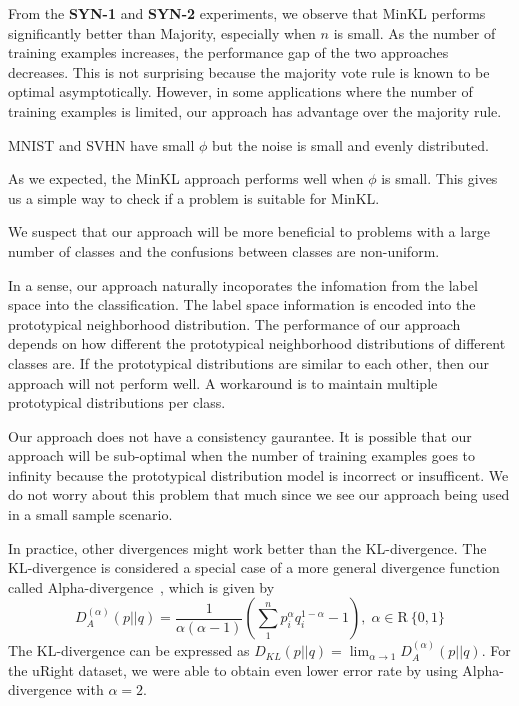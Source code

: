 \documentclass{article}
\begin{document}
From the \textbf{SYN-1} and \textbf{SYN-2} experiments, we observe
that MinKL performs significantly better than Majority, especially
when $n$ is small. As the number of training examples increases, the
performance gap of the two approaches decreases. This is not
surprising because the majority vote rule is known to be optimal
asymptotically. However, in some applications where the number of
training examples is limited, our approach has advantage over the
majority rule.

MNIST and SVHN have small $\phi$ but the noise is small and evenly distributed.


As we expected, the MinKL approach performs well when $\phi$ is
small. This gives us a simple way to check if a problem is suitable
for MinKL. 


We suspect that our approach will be more beneficial to problems with
a large number of classes and the confusions between classes are
non-uniform.


In a sense, our approach naturally incoporates the infomation from the
label space into the classification. The label space information is
encoded into the prototypical neighborhood distribution. The
performance of our approach depends on how different the prototypical
neighborhood distributions of different classes are. If the
prototypical distributions are similar to each other, then our
approach will not perform well. A workaround is to maintain multiple
prototypical distributions per class.

Our approach does not have a consistency gaurantee. It is
possible that our approach will be sub-optimal when the number of
training examples goes to infinity because the prototypical
distribution model is incorrect or insufficent. We do not worry
about this problem that much since we see our approach being used
in a small sample scenario.

In practice, other divergences might work better than the
KL-divergence. The KL-divergence is considered a special case of a
more general divergence function called
Alpha-divergence~\cite{Cichocki2010}, which is given by
\[
D^{(\alpha)}_A (p||q) = \frac{1}{\alpha(\alpha - 1)}\left( \sum_1^n
  p^{\alpha}_i q^{1-\alpha}_i - 1\right), \; \alpha \in \mathrm{R} \ \{0,1\}
\]
The KL-divergence can be expressed as $D_{KL} (p || q) = \lim_{\alpha
  \rightarrow 1} D^{(\alpha)}_A (p || q)$.  For the uRight dataset, we
were able to obtain even lower error rate by using Alpha-divergence
with $\alpha = 2$.
\end{document}
